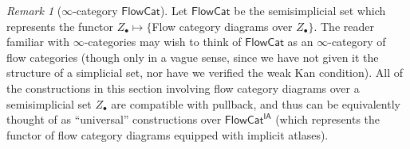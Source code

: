 \documentclass[12pt]{article}
\theoremstyle{definition}
\theoremstyle{remark}
\newtheorem{remark}[theorem]{Remark}
\numberwithin{equation}{subsection}
\newcommand{\FlowCat}{\mathsf{FlowCat}}
\newcommand{\FlowCatIA}{\mathsf{FlowCat}^{\mathsf{IA}}}
\begin{document}
\begin{remark}[$\infty$-category $\FlowCat$]
Let $\FlowCat$ be the semisimplicial set which represents the functor $Z_\bullet\mapsto\{$Flow category diagrams over $Z_\bullet\}$.  The reader familiar with $\infty$-categories may wish to think of $\FlowCat$ as an $\infty$-category of flow categories (though only in a vague sense, since we have not given it the structure of a simplicial set, nor have we verified the weak Kan condition).  All of the constructions in this section involving flow category diagrams over a semisimplicial set $Z_\bullet$ are compatible with pullback, and thus can be equivalently thought of as ``universal'' constructions over $\FlowCatIA$ (which represents the functor of flow category diagrams equipped with implicit atlases).
\end{remark}
\end{document}
